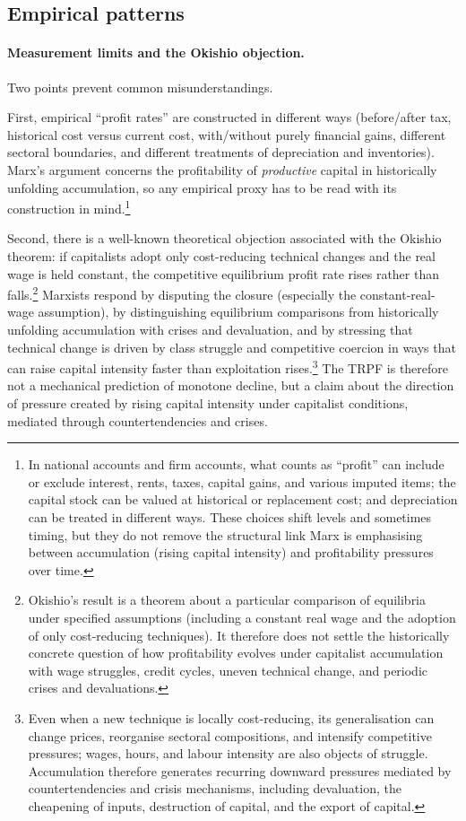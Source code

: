 \subsection{Empirical patterns}

\paragraph{Measurement limits and the Okishio objection.}
Two points prevent common misunderstandings.

First, empirical ``profit rates'' are constructed in different ways (before/after tax, historical cost versus current cost,
with/without purely financial gains, different sectoral boundaries, and different treatments of depreciation and inventories).
Marx's argument concerns the profitability of \emph{productive} capital in historically unfolding accumulation, so any empirical proxy
has to be read with its construction in mind.\cite{Shaikh2016,Roberts2016}\footnote{In national accounts and firm accounts, what counts as ``profit'' can include or exclude interest, rents, taxes, capital gains, and various imputed items; the capital stock can be valued at historical or replacement cost; and depreciation can be treated in different ways. These choices shift levels and sometimes timing, but they do not remove the structural link Marx is emphasising between accumulation (rising capital intensity) and profitability pressures over time.}

Second, there is a well-known theoretical objection associated with the Okishio theorem: if capitalists adopt only cost-reducing
technical changes and the real wage is held constant, the competitive equilibrium profit rate rises rather than falls.\cite{Okishio1961}\footnote{Okishio’s result is a theorem about a particular comparison of equilibria under specified assumptions (including a constant real wage and the adoption of only cost-reducing techniques). It therefore does not settle the historically concrete question of how profitability evolves under capitalist accumulation with wage struggles, credit cycles, uneven technical change, and periodic crises and devaluations.}
Marxists respond by disputing the closure (especially the constant-real-wage assumption), by distinguishing equilibrium comparisons
from historically unfolding accumulation with crises and devaluation, and by stressing that technical change is driven by class struggle
and competitive coercion in ways that can raise capital intensity faster than exploitation rises.\footnote{Even when a new technique is locally cost-reducing, its generalisation
can change prices, reorganise sectoral compositions, and intensify competitive
pressures; wages, hours, and labour intensity are also objects of struggle.
Accumulation therefore generates recurring downward pressures mediated by
countertendencies and crisis mechanisms, including devaluation, the cheapening
of inputs, destruction of capital, and the export of capital.}
The TRPF is therefore not a mechanical
prediction of monotone decline, but a claim about the direction of pressure created by rising capital intensity under capitalist conditions,
mediated through countertendencies and crises.

